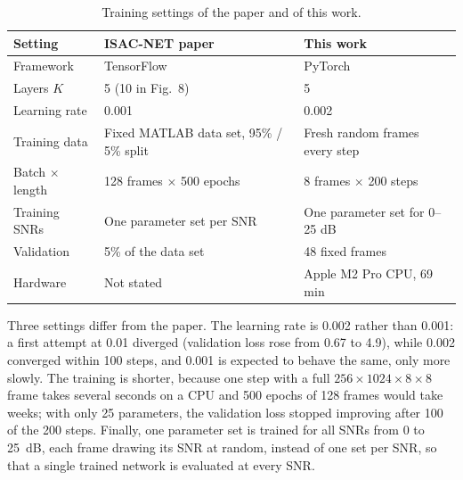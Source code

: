 \documentclass[11pt,a4paper]{article}
\begin{document}
\begin{table}[H]
\centering\small
\begin{tabular}{lll}
\toprule
Setting & ISAC-NET paper~\cite[Sec.~IV-B]{isacnet} & This work \\
\midrule
Framework & TensorFlow & PyTorch \\
Layers $K$ & 5 (10 in Fig.~8) & 5 \\
Learning rate & 0.001 & 0.002 \\
Training data & Fixed MATLAB data set, 95\% / 5\% split & Fresh random frames every step \\
Batch $\times$ length & 128 frames $\times$ 500 epochs & 8 frames $\times$ 200 steps \\
Training SNRs & One parameter set per SNR & One parameter set for 0--25 dB \\
Validation & 5\% of the data set & 48 fixed frames \\
Hardware & Not stated & Apple M2 Pro CPU, 69 min \\
\bottomrule
\end{tabular}
\caption{Training settings of the paper and of this work.}
\label{tab:train}
\end{table}

Three settings differ from the paper. The learning rate is 0.002 rather than 0.001: a first attempt at 0.01 diverged (validation loss rose from 0.67 to 4.9), while 0.002 converged within 100 steps, and 0.001 is expected to behave the same, only more slowly. The training is shorter, because one step with a full $256\times1024\times8\times8$ frame takes several seconds on a CPU and 500 epochs of 128 frames would take weeks; with only 25 parameters, the validation loss stopped improving after 100 of the 200 steps. Finally, one parameter set is trained for all SNRs from 0 to 25~dB, each frame drawing its SNR at random, instead of one set per SNR, so that a single trained network is evaluated at every SNR.
\end{document}
